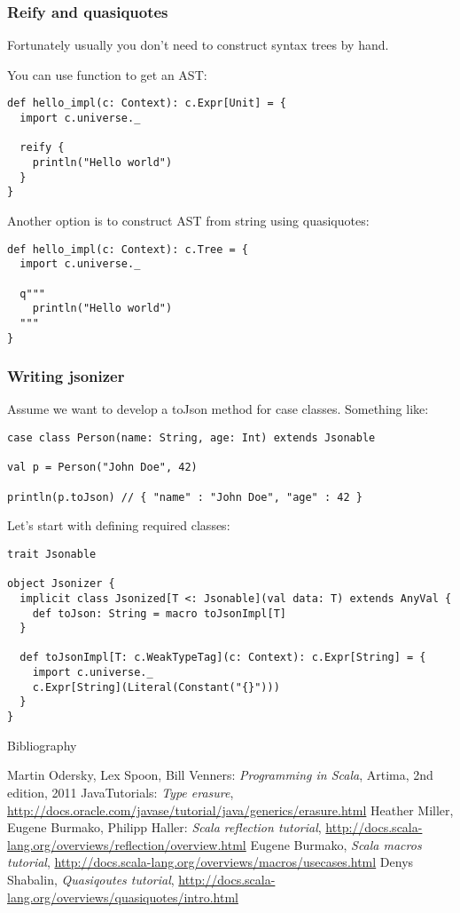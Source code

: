 \documentclass[t]{beamer}
\begin{document}
\begin{frame}[fragile]
\frametitle{Reify and quasiquotes}
Fortunately usually you don't need to construct syntax trees by hand.

You can use function  to get an AST:
\begin{lstlisting}
def hello_impl(c: Context): c.Expr[Unit] = {
  import c.universe._

  reify {
    println("Hello world")
  }
}
\end{lstlisting}

Another option is to construct AST from string using quasiquotes:
\begin{lstlisting}
def hello_impl(c: Context): c.Tree = {
  import c.universe._

  q"""
    println("Hello world")
  """
}
\end{lstlisting}
\end{frame}

\begin{frame}[fragile]
\frametitle{Writing jsonizer}
Assume we want to develop a toJson method for case classes. Something like:
\begin{lstlisting}
case class Person(name: String, age: Int) extends Jsonable

val p = Person("John Doe", 42)

println(p.toJson) // { "name" : "John Doe", "age" : 42 }
\end{lstlisting}

Let's start with defining required classes:
\begin{lstlisting}
trait Jsonable

object Jsonizer {
  implicit class Jsonized[T <: Jsonable](val data: T) extends AnyVal {
    def toJson: String = macro toJsonImpl[T]
  }

  def toJsonImpl[T: c.WeakTypeTag](c: Context): c.Expr[String] = {
    import c.universe._
    c.Expr[String](Literal(Constant("{}")))
  }
}
\end{lstlisting}

\end{frame}

\begin{frame}{Bibliography}
\begin{thebibliography}{00}
Martin Odersky, Lex Spoon, Bill Venners:
\emph{Programming in Scala},
Artima, 2nd edition, 2011
Java\texttrademark  Tutorials: \emph{Type erasure}, \url{http://docs.oracle.com/javase/tutorial/java/generics/erasure.html}
Heather Miller, Eugene Burmako, Philipp Haller: \emph{Scala reflection tutorial}, \url{http://docs.scala-lang.org/overviews/reflection/overview.html}
Eugene Burmako, \emph{Scala macros tutorial}, \url{http://docs.scala-lang.org/overviews/macros/usecases.html}
Denys Shabalin, \emph{Quasiqoutes tutorial}, \url{http://docs.scala-lang.org/overviews/quasiquotes/intro.html}
\end{thebibliography}
\end{frame}


\end{document}
